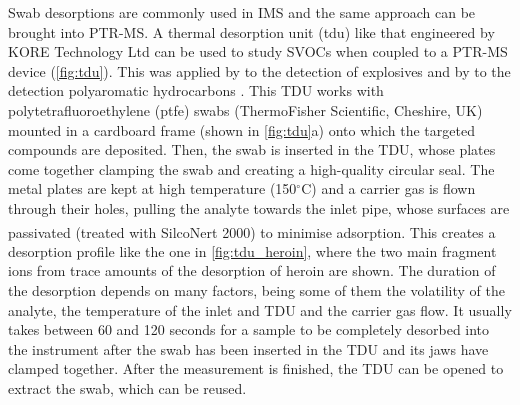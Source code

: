Swab desorptions are commonly used in  IMS  and the same approach can be brought into PTR-MS.
%
A thermal desorption unit (\acrshort{tdu})  like that engineered by KORE Technology Ltd  can be used to study SVOCs when coupled to a PTR-MS device (\autoref{fig:tdu}).
%
This was applied by \citeauthor{RN445} to the detection of explosives %
and by \citeauthor{blenkhorn2019novel} to the detection polyaromatic hydrocarbons \cite{RN445,blenkhorn2019novel}.
%
This TDU works with polytetrafluoroethylene (\acrshort{ptfe}) swabs (ThermoFisher Scientific, Cheshire, UK) mounted in a cardboard frame (shown in \autoref{fig:tdu}a) onto which the targeted compounds are deposited.
%
Then, the swab is inserted in the TDU, whose plates come together clamping the swab and creating a high-quality circular seal. The metal plates are kept at high temperature (150$^{\circ}$C) and a carrier gas is flown through their holes, pulling the analyte towards the inlet pipe, whose surfaces are passivated (treated with SilcoNert\textsuperscript{\textregistered} 2000) to minimise adsorption.
%
This creates a desorption profile like the one in \autoref{fig:tdu_heroin}, where the two main fragment ions from trace amounts of the desorption of heroin are shown.
%
The duration of the desorption depends on many factors, being some of them the volatility of the analyte, the temperature of the inlet and TDU and the carrier gas flow.
%
It usually takes between 60 and 120 seconds for a sample to be completely desorbed into the instrument after the swab has been inserted in the TDU and its jaws have clamped together. After the measurement is finished, the TDU can be opened to extract the swab, which can be reused.








